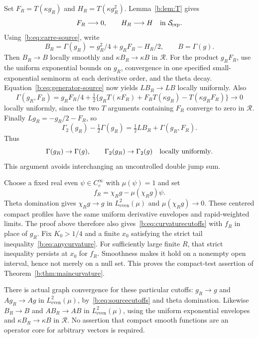 \documentclass[11pt,a4paper]{article}
\numberwithin{equation}{section}
\theoremstyle{definition}\newtheorem{definition}[theorem]{Definition}
\theoremstyle{remark}\newtheorem{remark}[theorem]{Remark}
\newcommand{\He}{L^2_{\mathrm{even}}(\mu)}\newcommand{\Le}{L^2_{\mathrm{even}}(dx)}
\newcommand{\RR}{\mathscr R}\newcommand{\SSS}{\mathcal S_{\!\exp}}\newcommand{\CE}{\mathcal C_{\exp}}
\begin{document}
Set $F_R=T(\kappa g_R)$ and $H_R=T(\kappa g_R^2)$. Lemma~\ref{b:lem:T} gives
\begin{equation}\label{b:eq:sourcecutoffs}
 F_R\longrightarrow0,\qquad H_R\longrightarrow H\quad\hbox{in }\SSS.
\end{equation}
Using~\eqref{b:eq:carre-source}, write
\[
 B_R=\Gamma(g_R)=g_R^2/4+g_RF_R-H_R/2,
 \qquad B=\Gamma(g).
\]
Then $B_R\to B$ locally smoothly and $\kappa B_R\to\kappa B$ in $\RR$. For the product $g_RF_R$, use the uniform exponential bounds on $g_R$, convergence in one specified small-exponential seminorm at each derivative order, and the theta decay. Equation~\eqref{b:eq:generator-source} now yields $LB_R\to LB$ locally uniformly. Also
\[
 \Gamma(g_R,F_R)=g_RF_R/4+\tfrac12\{g_RT(\kappa F_R)
                  +F_RT(\kappa g_R)-T(\kappa g_RF_R)\}\longrightarrow0
\]
locally uniformly, since the two $T$ arguments containing $F_R$ converge to zero in $\RR$. Finally $Lg_R=-g_R/2-F_R$, so
\[
 \Gamma_2(g_R)-\tfrac12\Gamma(g_R)
       =\tfrac12LB_R+\Gamma(g_R,F_R).
\]
Thus
\begin{equation}\label{b:eq:curvaturecutoffs}
 \Gamma(g_R)\to\Gamma(g),\qquad \Gamma_2(g_R)\to\Gamma_2(g)
 \quad\hbox{locally uniformly}.
\end{equation}
This argument avoids interchanging an uncontrolled double jump sum.

Choose a fixed real even $\psi\in C_c^\infty$ with $\mu(\psi)=1$ and set
\begin{equation}\label{b:eq:centeredcutoff}
 f_R=\chi_Rg-\mu(\chi_Rg)\psi.
\end{equation}
Theta domination gives $\chi_Rg\to g$ in $\He$ and $\mu(\chi_Rg)\to0$. These centered compact profiles have the same uniform derivative envelopes and rapid-weighted limits. The proof above therefore also gives~\eqref{b:eq:curvaturecutoffs} with $f_R$ in place of $g_R$. Fix $K_0>1/4$ and a finite $x_0$ satisfying the strict tail inequality~\eqref{b:eq:anycurvature}. For sufficiently large finite $R$, that strict inequality persists at $x_0$ for $f_R$. Smoothness makes it hold on a nonempty open interval, hence not merely on a null set. This proves the compact-test assertion of Theorem~\ref{b:thm:maincurvature}.

There is actual graph convergence for these particular cutoffs: $g_R\to g$ and $Ag_R\to Ag$ in $\He$, by~\eqref{b:eq:sourcecutoffs} and theta domination. Likewise $B_R\to B$ and $AB_R\to AB$ in $\He$, using the uniform exponential envelopes and $\kappa B_R\to\kappa B$ in $\RR$. No assertion that compact smooth functions are an operator core for arbitrary vectors is required.
\end{document}
